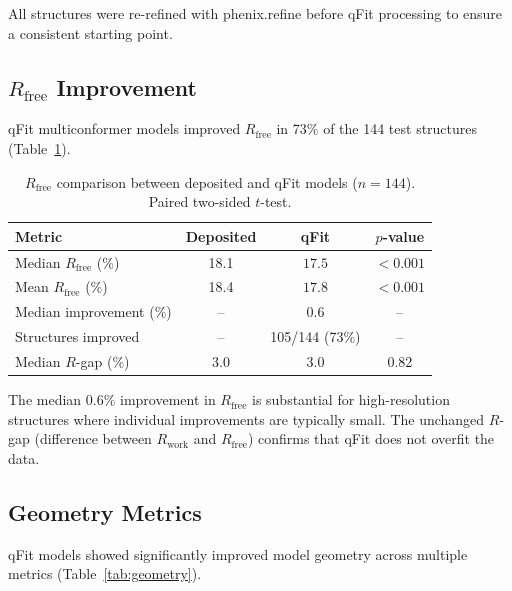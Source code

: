 \documentclass[11pt]{article}
\begin{document}
All structures were re-refined with phenix.refine \citep{phenix_liebschner2019} before qFit processing to ensure a consistent starting point.

\subsection{$R_{\text{free}}$ Improvement}

qFit multiconformer models improved $R_{\text{free}}$ in 73\% of the 144 test structures (Table~\ref{tab:rfree}).

\begin{table}[H]
\centering
\caption{$R_{\text{free}}$ comparison between deposited and qFit models ($n = 144$). Paired two-sided $t$-test.}
\label{tab:rfree}
\begin{tabular}{lccc}
\toprule
Metric & Deposited & qFit & $p$-value \\
\midrule
Median $R_{\text{free}}$ (\%) & 18.1 & $\mathbf{17.5}$ & $< 0.001$ \\
Mean $R_{\text{free}}$ (\%) & 18.4 & $\mathbf{17.8}$ & $< 0.001$ \\
Median improvement (\%) & -- & 0.6 & -- \\
Structures improved & -- & 105/144 (73\%) & -- \\
Median $R$-gap (\%) & 3.0 & 3.0 & 0.82 \\
\bottomrule
\end{tabular}
\end{table}

The median 0.6\% improvement in $R_{\text{free}}$ is substantial for high-resolution structures where individual improvements are typically small. The unchanged $R$-gap (difference between $R_{\text{work}}$ and $R_{\text{free}}$) confirms that qFit does not overfit the data.

\subsection{Geometry Metrics}

qFit models showed significantly improved model geometry across multiple metrics (Table~\ref{tab:geometry}).
\end{document}
